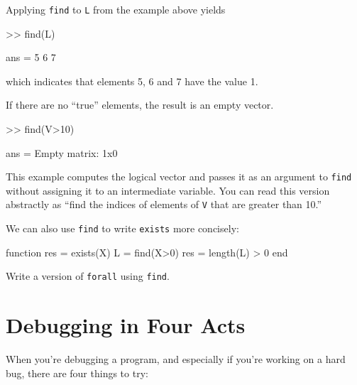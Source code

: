 
Applying {\tt find} to {\tt L} from the example above yields

\begin{code}
>> find(L)

ans = 5     6     7
\end{code}

which indicates that elements 5, 6 and 7 have the value 1.

If there are no ``true'' elements, the result is an empty vector.

\begin{code}
>> find(V>10)

ans = Empty matrix: 1x0
\end{code}

This example computes the logical vector and passes it as an
argument to {\tt find} without assigning it to an intermediate
variable.  You can read this version abstractly as ``find
the indices of elements of {\tt V} that are greater than 10.''

We can also use {\tt find} to write {\tt exists} more concisely:

\begin{code}
function res = exists(X)
    L = find(X>0)
    res = length(L) > 0
end
\end{code}

\begin{ex}
Write a version of {\tt forall} using {\tt find}.
\end{ex}


\section{Debugging in Four Acts}


When you're debugging a program, and especially if you're working on a hard bug, there are four things to try:

